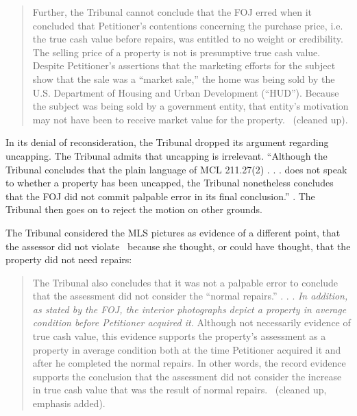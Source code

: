 \documentclass[12pt,\documentclassflag]{michiganCourtOfAppealsBrief}
\begin{document}
\begin{quote}
Further, the Tribunal cannot conclude that the FOJ erred when it
concluded that Petitioner's contentions concerning the purchase price, i.e. the true cash value before repairs, was entitled to no weight or credibility. The selling price of a property is not is presumptive true cash value. Despite Petitioner's assertions that the marketing efforts for the subject show that the sale was a ``market sale,'' the home was
being sold by the U.S. Department of Housing and Urban Development (``HUD''). Because the subject was being sold by a government entity, that entity's motivation may not have been to receive market value for the property. \reconsiderationDenied[2]\ (cleaned up).
\end{quote}

In its denial of reconsideration, the Tribunal dropped its argument regarding uncapping. The Tribunal admits that uncapping is irrelevant. ``Although the Tribunal concludes that the plain language of MCL 211.27(2) . . . does not speak to whether a property has been uncapped, the Tribunal nonetheless concludes that the FOJ did not commit palpable error in its final conclusion.'' \reconsiderationDenied[1-2]. The Tribunal then goes on to reject the motion on other grounds. 

The Tribunal considered the MLS pictures as evidence of a different point, that the assessor did not violate \mathieuGast\ because she thought, or could have thought, that the property did not need repairs:

\begin{quote}
  The Tribunal also concludes that it was not a palpable error to conclude that the assessment did not consider the ``normal repairs.'' . . .
  {\em In addition, as stated by the FOJ, the interior photographs depict a property in average condition before Petitioner acquired it.} Although not necessarily evidence of true cash value, this evidence supports the property's assessment as a property in average condition both at the time Petitioner acquired it and after he completed the normal repairs. In other words, the record evidence supports the conclusion that the assessment did not consider the increase in true cash value that was the result of normal repairs. \reconsiderationDenied[2]\ (cleaned up, emphasis added).
\end{quote}
\end{document}
